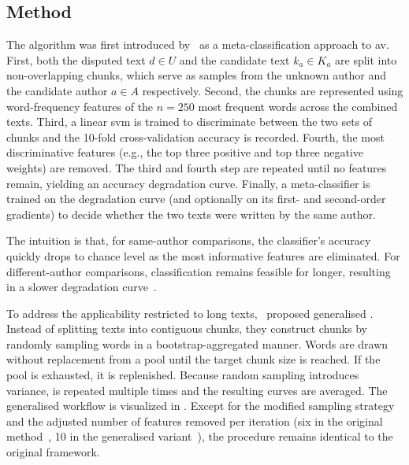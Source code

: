 \subsection{\unmasking{} Method}
\label{subsec:unmasking}

The \unmasking{} algorithm was first introduced by \citet{koppel_authorship_2004}\ as a meta-classification approach to \ac{av}. 
First, both the disputed text $d \in U$ and the candidate text $k_a \in K_a$ are split into non-overlapping chunks, which serve as samples from the unknown author and the candidate author $a \in A$ respectively. 
Second, the chunks are represented using word-frequency features of the $n=250$ most frequent words across the combined texts.
Third, a linear \ac{svm} is trained to discriminate between the two sets of chunks and the 10-fold cross-validation accuracy is recorded.
Fourth, the most discriminative features (e.g., the top three positive and top three negative weights) are removed.  
The third and fourth step are repeated until no features remain, yielding an accuracy degradation curve.  
Finally, a meta-classifier is trained on the degradation curve (and optionally on its first- and second-order gradients) to decide whether the two texts were written by the same author.  

The intuition is that, for same-author comparisons, the classifier’s accuracy quickly drops to chance level as the most informative features are eliminated. 
For different-author comparisons, classification remains feasible for longer, resulting in a slower degradation curve~\citep{stein_intrinsic_2011,tyo_state_2022,bevendorff_divergence_based_2020,stamatatos_survey_2009}. 

To address the applicability restricted to long texts, \citet{bevendorff_generalizing_2019,bevendorff_divergence_based_2020}\ proposed generalised \unmasking{}. 
Instead of splitting texts into contiguous chunks, they construct chunks by randomly sampling words in a bootstrap-aggregated manner. 
Words are drawn without replacement from a pool until the target chunk size is reached.
If the pool is exhausted, it is replenished. 
Because random sampling introduces variance, \unmasking{} is repeated multiple times and the resulting curves are averaged. 
The generalised \unmasking{} workflow is visualized in . 
Except for the modified sampling strategy and the adjusted number of features removed per iteration (six in the original method~\citep{koppel_authorship_2004}, 10 in the generalised variant~\citep{bevendorff_generalizing_2019}), the procedure remains identical to the original \unmasking{} framework.

